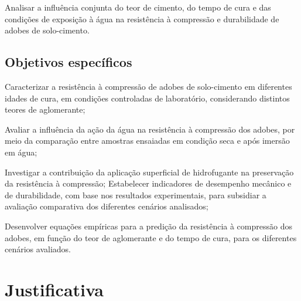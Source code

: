 
Analisar a influência conjunta do teor de cimento, do tempo de cura e das condições de exposição à água na resistência à compressão e durabilidade de adobes de solo-cimento.

\subsection{Objetivos específicos}


\begin{alineas}
    \item Caracterizar a resistência à compressão de adobes de solo-cimento em diferentes idades de cura, em condições controladas de laboratório, considerando distintos teores de aglomerante; 
    \item Avaliar a influência da ação da água na resistência à compressão dos adobes, por meio da comparação entre amostras ensaiadas em condição seca e após imersão em água; 
    \item Investigar a contribuição da aplicação superficial de hidrofugante na preservação da resistência à compressão; Estabelecer indicadores de desempenho mecânico e de durabilidade, com base nos resultados experimentais, para subsidiar a avaliação comparativa dos diferentes cenários analisados; 
    \item Desenvolver equações empíricas para a predição da resistência à compressão dos adobes, em função do teor de aglomerante e do tempo de cura, para os diferentes cenários avaliados.
\end{alineas}

\section{Justificativa}



